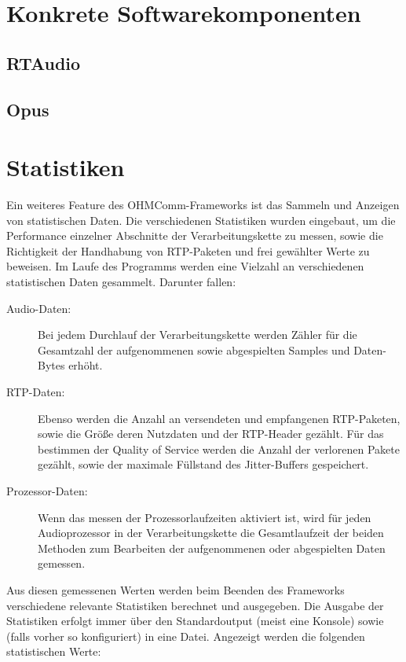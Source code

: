 \FloatBarrier

\section{Konkrete Softwarekomponenten}
\subsection{RTAudio}
\label{sec:RTAudio}
\subsection{Opus}
\section{Statistiken}
Ein weiteres Feature des OHMComm-Frameworks ist das Sammeln und Anzeigen von statistischen Daten. Die verschiedenen Statistiken wurden eingebaut, um die Performance einzelner Abschnitte der Verarbeitungskette zu messen, sowie die Richtigkeit der Handhabung von RTP-Paketen und frei gewählter Werte zu beweisen. Im Laufe des Programms werden eine Vielzahl an verschiedenen statistischen Daten gesammelt. Darunter fallen:
\begin{description}
\item[Audio-Daten:] Bei jedem Durchlauf der Verarbeitungskette werden Zähler für die Gesamtzahl der aufgenommenen sowie abgespielten Samples und Daten-Bytes erhöht.
\item[RTP-Daten:] Ebenso werden die Anzahl an versendeten und empfangenen RTP-Paketen, sowie die Größe deren Nutzdaten und der RTP-Header gezählt. Für das bestimmen der Quality of Service werden die Anzahl der verlorenen Pakete gezählt, sowie der maximale Füllstand des Jitter-Buffers gespeichert.
\item[Prozessor-Daten:] Wenn das messen der Prozessorlaufzeiten aktiviert ist, wird für jeden Audioprozessor in der Verarbeitungskette die Gesamtlaufzeit der beiden Methoden zum Bearbeiten der aufgenommenen oder abgespielten Daten gemessen.
\end{description}
Aus diesen gemessenen Werten werden beim Beenden des Frameworks verschiedene relevante Statistiken berechnet und ausgegeben. Die Ausgabe der Statistiken erfolgt immer über den Standardoutput (meist eine Konsole) sowie (falls vorher so konfiguriert) in eine Datei. Angezeigt werden die folgenden statistischen Werte:
